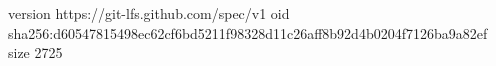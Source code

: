 version https://git-lfs.github.com/spec/v1
oid sha256:d60547815498ec62cf6bd5211f98328d11c26aff8b92d4b0204f7126ba9a82ef
size 2725
